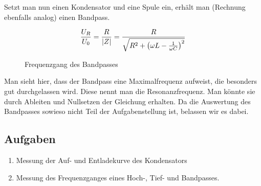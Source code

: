 Setzt man nun einen Kondensator und eine Spule ein, erhält man (Rechnung
ebenfalls analog) einen Bandpass.


\begin{equation}
  \frac{U_R}{U_0} = \frac{R}{|Z|} = \frac{R}{\sqrt{R^2 + \del{\omega L - \frac{1}{\omega C}}^2}}
\end{equation}

\begin{figure}[H]
  \begin{center}
    \caption{Frequenzgang des Bandpasses}
  \end{center}
\end{figure}

Man sieht hier, dass der Bandpass eine Maximalfrequenz aufweist, die besonders
gut durchgelassen wird. Diese nennt man die Resonanzfrequenz. Man könnte sie
durch Ableiten und Nullsetzen der Gleichung erhalten. Da die Auswertung des
Bandpasses sowieso nicht Teil der Aufgabenstellung ist, belassen wir es dabei.

\subsection{Aufgaben}

\begin{enumerate}
  \item Messung der Auf- und Entladekurve des Kondensators
  \item Messung des Frequenzganges eines Hoch-, Tief- und Bandpasses.
\end{enumerate}

